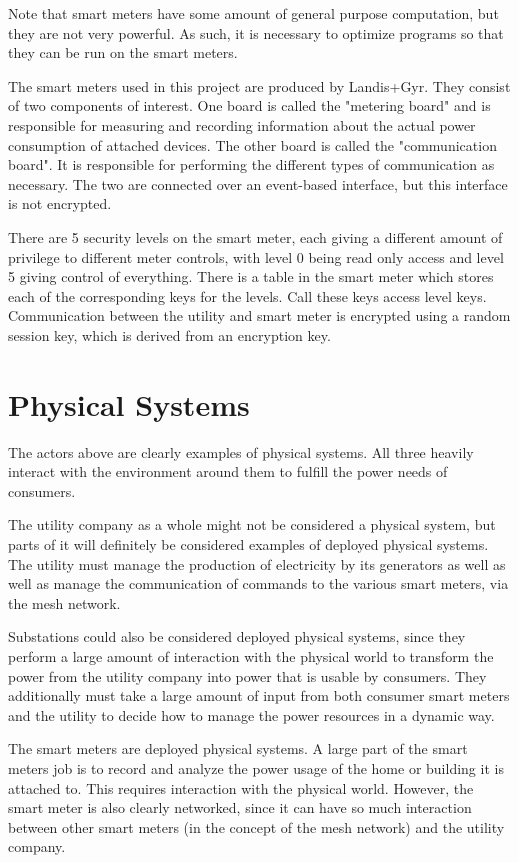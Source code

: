 Note that smart meters have some amount of general purpose computation, but they are not very powerful. As such,
it is necessary to optimize programs so that they can be run on the smart meters.

The smart meters used in this project are produced by Landis+Gyr. They consist of two components of interest. One
board is called the "metering board" and is responsible for measuring and recording information about the actual
power consumption of attached devices. The other board is called the "communication board". It is responsible for
performing the different types of communication as necessary. The two are connected over an event-based interface,
but this interface is not encrypted. 

There are 5 security levels on the smart meter, each giving a different amount of privilege to different meter controls,
with level 0 being read only access and level 5 giving control of everything. There is a table in the smart meter which
stores each of the corresponding keys for the levels. Call these keys access level keys.
Communication between the utility and smart meter is encrypted
using a random session key, which is derived from an encryption key.

\section{Physical Systems}
The actors above are clearly examples of physical systems. All three heavily interact with the environment around them
to fulfill the power needs of consumers.

The utility company as a whole might not be considered a physical system, but parts of it will definitely be considered
examples of deployed physical systems. The utility must manage the production of electricity by its generators as well
as well as manage the communication of commands to the various smart meters, via the mesh network.

Substations could also be considered deployed physical systems, since they perform a large amount of interaction
with the physical world to transform the power from the utility company into power that is usable by consumers.
They additionally must take a large amount of input from both consumer smart meters and the utility to decide how
to manage the power resources in a dynamic way.

The smart meters are deployed physical systems. A large part of the smart meters job is to record and analyze
the power usage of the home or building it is attached to. This requires interaction with the physical world. However,
the smart meter is also clearly networked, since it can have so much interaction between other smart meters (in the 
concept of the mesh network) and the utility company.


